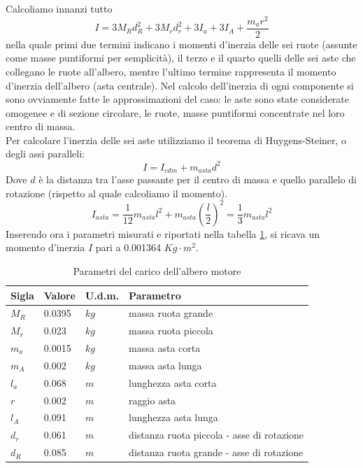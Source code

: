 Calcoliamo innanzi tutto 
$$
I=3M_Rd_R^2+3M_rd_r^2+3I_a+3I_A+\displaystyle\frac{m_ar^2}{2}
$$
nella quale primi due termini indicano i momenti d'inerzia delle sei ruote (assunte come masse puntiformi per semplicità), il terzo e il quarto quelli delle sei aste che collegano le ruote all'albero, mentre l'ultimo termine rappresenta il momento d'inerzia dell'albero (asta centrale). Nel calcolo dell'inerzia di ogni componente si sono ovviamente fatte le approssimazioni del caso: le aste sono state considerate omogenee e di sezione circolare, le ruote, masse puntiformi concentrate nel loro centro di massa.\\
Per calcolare l'inerzia delle sei aste utilizziamo il teorema di Huygens-Steiner, o degli assi paralleli:
$$
I=I_{cdm}+m_{asta}d^2
$$
Dove $d$ è la distanza tra l'asse passante per il centro di massa e quello parallelo di rotazione (rispetto al quale calcoliamo il momento).\\
$$
I_{asta}=\displaystyle\frac{1}{12}m_{asta}l^2+m_{asta}(\displaystyle\frac{l}{2})^2=\displaystyle\frac{1}{3}m_{asta}l^2
$$
Inserendo ora i parametri misurati  e riportati nella tabella \ref{Inerzia}, si ricava un momento d'inerzia $I$ pari a 0.001364 $Kg\cdot m^2$.
\begin{table}[ht]
	\begin{tabular}{|l|l|l|l|}
		\hline
		\textbf{Sigla} & \textbf{Valore} & \textbf{U.d.m.} & \textbf{Parametro}\\
		\hline
		$M_R$ & 0.0395 & $kg$ & massa ruota grande\\
		\hline
		$M_r$ & 0.023 & $kg$ & massa ruota piccola\\
		\hline
		$m_a$ & 0.0015 & $kg$ & massa asta corta\\	
		\hline
		$m_A$ & 0.002 & $kg$ & massa asta lunga\\	
		\hline
		$l_a$ & 0.068 & $m$ & lunghezza asta corta\\
		\hline
		$r$ & 0.002 & $m$ & raggio asta\\
		\hline
		$l_A$ & 0.091 & $m$ & lunghezza asta lunga\\
		\hline
		$d_r$ & 0.061 & $m$ & distanza ruota piccola - asse di rotazione\\
		\hline
		$d_R$ & 0.085 & $m$  & distanza ruota grande - asse di rotazione\\
		\hline
	\end{tabular}
\caption{Parametri del carico dell'albero motore}
\label{Inerzia}
\end{table}


